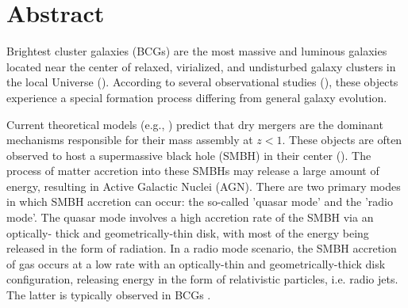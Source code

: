 \chapter*{Abstract}


Brightest cluster galaxies (BCGs) are the most massive and luminous galaxies
located near the center of relaxed, virialized, and undisturbed galaxy clusters in the local Universe
(\cite{1976ApJ...205..688S, 2010MNRAS.404.1231V}). According to several observational studies
(\cite{2017MNRAS.467.4101G, 2020MNRAS.498.2719T}), these objects experience a special formation
process differing from general galaxy evolution.

Current theoretical models (e.g., \cite{2007MNRAS.375....2D, 2019ApJ...881..150C}) predict that dry
mergers are the dominant mechanisms responsible for their mass assembly at $z < 1$. These
objects are often observed to host a supermassive black hole (SMBH) in their center (\cite{2006ApJ...652..216R}).
The process of matter accretion into these SMBHs may release a large amount of
energy, resulting in Active Galactic Nuclei (AGN). There are two primary modes in which SMBH
accretion can occur: the so-called ’quasar mode’ and the ’radio mode’. The quasar mode involves
a high accretion rate of the SMBH via an optically- thick and geometrically-thin disk, with most of
the energy being released in the form of radiation. In a radio mode scenario, the SMBH accretion
of gas occurs at a low rate with an optically-thin and geometrically-thick disk configuration,
releasing energy in the form of relativistic particles, i.e. radio jets. The latter is typically observed in
BCGs \cite{2012MNRAS.422.2213S}.

